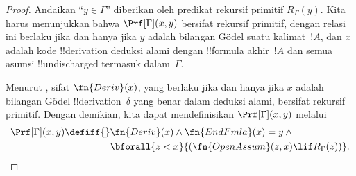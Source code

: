 \documentclass[../../../include/open-logic-section]{subfiles}
\begin{document}
\begin{proof}
  Andaikan ``$y \in \Gamma$'' diberikan oleh predikat rekursif primitif
  $R_\Gamma(y)$. Kita harus menunjukkan bahwa $\Prf[\Gamma](x, y)$ bersifat
  rekursif primitif, dengan relasi ini berlaku jika dan hanya jika $y$ adalah
  bilangan G\"odel suatu kalimat~$!A$, dan $x$ adalah kode !!{derivation}
  deduksi alami dengan !!{formula} akhir~$!A$ dan semua asumsi
  !!{undischarged} termasuk dalam~$\Gamma$.

  Menurut , sifat $\fn{Deriv}(x)$, yang berlaku jika dan hanya
  jika $x$ adalah bilangan G\"odel !!{derivation}~$\delta$ yang benar dalam
  deduksi alami, bersifat rekursif primitif. Dengan demikian, kita dapat
  mendefinisikan $\Prf[\Gamma](x, y)$ melalui
  \begin{align*}
    \Prf[\Gamma](x, y) \defiff {}
    & \fn{Deriv}(x) \land \fn{EndFmla}(x) = y \land {} \\
    & \bforall{z < x}{(\fn{OpenAssum}(z, x) \lif R_\Gamma(z))}.
  \end{align*}
\end{proof}
\end{document}
